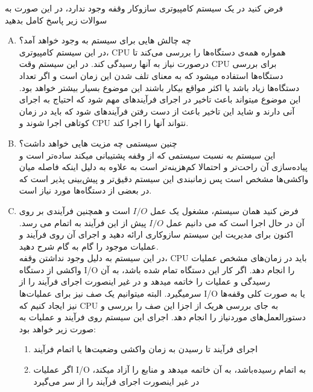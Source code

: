 \documentclass[]{article}
\begin{document}
فرض کنید در یک سیستم کامپیوتری سازوکار وقفه وجود ندارد، در این صورت به سوالات زیر پاسخ کامل بدهید

\begin{enumerate}[(A)]
    \item چه چالش هایی برای سیستم به وجود خواهد آمد؟ \\
    در این سیستم کامپیوتری،‌
    CPU
    همواره همه‌ی دستگاه‌ها را بررسی می‌کند تا درصورت نیاز
    به آنها رسیدگی کند. در این سیستم وقت
    CPU
    برای بررسی دستگاه‌ها استفاده میشود که به معنای تلف شدن این زمان است و
    اگر تعداد دستگاه‌ها زیاد باشد یا اکثر مواقع بیکار باشند این موضوع بسیار بیشتر خواهد بود.
    این موضوع میتواند باعث تاخیر در اجرای فرآیند‌های مهم شود که احتیاج به اجرای آنی دارند و شاید
    این تاخیر باعث از دست رفتن فرآیند‌های شود که باید در زمان کوتاهی اجرا شوند و
    CPU
    نتواند آنها را اجرا کند.
    \item چنین سیستمی چه مزیت هایی خواهد داشت؟ \\
    این سیستم به نسبت سیستمی که از وقفه پشتیبانی میکند ساده‌تر است و پیاده‌سازی آن
    راحت‌تر و احتمالا کم‌هزینه‌تر است به علاوه به دلیل اینکه فاصله میان واکشی‌ها مشخص است پس 
    زمانبندی این سیستم دقیق‌تر و پیش‌بینی پذیر است که در بعضی از دستگاه‌ها مورد نیاز است.
    \item فرض کنید همان سیستم، مشغول یک عمل
    $I/O$
    است و همچنین فرآیندی بر روی آن در حال اجرا است که می دانیم عمل
    $I/O$
    پیش از این فرآیند به اتمام می رسد.
    اکنون برای مدیریت این سیستم سازوکاری ارائه دهید و اجرای آن روی فرآیند و عملیات موجود را گام به گام شرح دهید. \\
    در این سیستم به دلیل وجود نداشتن وقفه،
    CPU
    باید در زمان‌های مشخص عملیات واکشی از دستگاه
    I/O
    را انجام دهد. اگر کار این دستگاه تمام شده باشد، به آن رسیدگی و عملیات را خاتمه میدهد
    و در غیر اینصورت اجرای فرآیند را از سرمیگیرد.
    البته میتوانیم یک صف نیز برای عملیات‌ها
    I/O
    یا به صورت کلی وقفه‌ها نیز ایجاد کنیم که
    CPU
    به جای بررسی هریک از اجزا این صف را بررسی و دستورالعمل‌های موردنیاز را انجام دهد.
    اجرای این سیستم روی فرآیند و عملیات به صورت زیر خواهد بود:
    \begin{enumerate}[1-]
        \item اجرای فرآیند تا رسیدن به زمان واکشی وضعیت‌ها یا اتمام فرآیند
        \item اگر عملیات
        I/O
        به اتمام رسیده‌باشد، به آن خاتمه میدهد و منابع را آزاد میکند،
        در غیر اینصورت اجرای فرآیند را از سر می‌گیرد
    \end{enumerate}
\end{enumerate}
\end{document}
